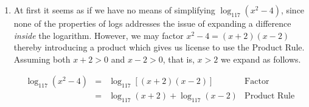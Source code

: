 \documentclass{ximera}
\begin{document}
\begin{example}
\begin{explanation}
\begin{enumerate}
\[ \begin{array}{rclr}

\log \sqrt[3]{\frac{100 x^2}{yz^5}} & = & \log \left(\frac{100 x^2}{yz^5}\right)^{1/3} & \\  
& = & \frac{1}{3} \log\left(\frac{100 x^2}{yz^5}\right) & \text{Power Rule} \\ 
& = & \frac{1}{3} \left[ \log\left(100x^2\right) - \log\left(yz^5\right) \right] & \text{Quotient Rule} \\ 
& = & \frac{1}{3}\log\left(100x^2\right) - \frac{1}{3}\log\left(yz^5\right) & \\
& = & \frac{1}{3}\left[ \log(100) + \log\left(x^2\right)\right] - \frac{1}{3} \left[ \log(y) + \log\left(z^5\right) \right] & \text{Product Rule} \\
& = & \frac{1}{3} \log(100) + \frac{1}{3} \log\left(x^2\right) - \frac{1}{3} \log(y) - \frac{1}{3} \log\left(z^5\right) \\
& = & \frac{1}{3} \log(100) + \frac{2}{3} \log(x) - \frac{1}{3} \log(y) - \frac{5}{3} \log(z) & \text{Power Rule} \\
& = & \frac{2}{3} + \frac{2}{3} \log(x) - \frac{1}{3} \log(y) - \frac{5}{3} \log(z) & \text{Since $10^2=100$} \\
& = &  \frac{2}{3} \log(x) - \frac{1}{3} \log(y) - \frac{5}{3} \log(z) + \frac{2}{3} & \\
\end{array} \]


\item  At first it seems as if we have no means of simplifying $\log_{117}\left(x^2-4\right)$, since none of the properties of logs addresses the issue of expanding a difference \textit{inside} the logarithm.  However, we may factor $x^2 - 4 = (x+2)(x-2)$ thereby introducing a product which gives us license to use the Product Rule.  Assuming both $x+2>0$ and $x-2>0$, that is, $x >2$  we expand as follows.


\[ \begin{array}{rclr}

\log_{117}\left(x^2-4\right) & = & \log_{117} \left[(x+2)(x-2)\right] & \text{Factor} \\
& = & \log_{117}(x+2) + \log_{117}(x-2) & \text{Product Rule} \\
\end{array}\]

\end{enumerate}
\end{explanation}
\end{example}
\end{document}
